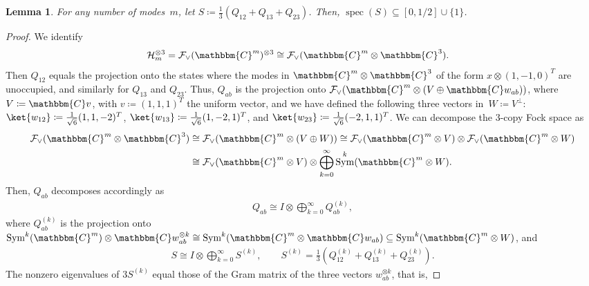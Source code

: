 \documentclass[11pt,a4paper]{article}
\newtheorem{lemma}[theorem]{Lemma}\AddToHook{env/lemma/begin}{\crefalias{theorem}{lemma}}
\numberwithin{equation}{section}
\newcommand{\ot}{\otimes}
\newcommand{\op}{\oplus}
\newcommand{\CC}{\mathbbm{C}}
\newcommand{\HH}{\mathcal{H}}
\newcommand{\1}{\mathbf{1}}
\DeclareMathOperator{\Sym}{Sym}
\DeclareMathOperator{\spec}{spec}
\begin{document}
\begin{lemma}\label{lem:S-spectrum-coherent-states}
For any number of modes~$m$, let $S \coloneqq \frac13 ( Q_{12} + Q_{13} + Q_{23} )$.
Then, $\spec(S)\subseteq[0,1/2]\cup\{1\}$.
\end{lemma}
\begin{proof}
    We identify
    \begin{align*}
        \HH_m^{\ot 3} &=
        \mathcal F_\vee(\CC^m)^{\ot 3} \cong \mathcal F_\vee(\CC^m \ot \CC^3).
    \end{align*}
    Then $Q_{12}$ equals the projection onto the states where the modes in $\CC^m \ot \CC^3$ of the form $x \ot (1,-1,0)^T$ are unoccupied, and similarly for $Q_{13}$ and $Q_{23}$.
    Thus, $Q_{ab}$ is the projection onto $\mathcal F_\vee(\CC^m \ot (V \op \CC w_{ab}))$, where~$V \coloneqq \CC v$, with $v \coloneqq (1,1,1)^T$ the uniform vector, and we have defined the following three vectors in~$W \coloneq V^\perp$:
    $\ket{w_{12}} \coloneqq \frac{1}{\sqrt6}(1,1,-2)^T$,
    $\ket{w_{13}} \coloneqq \frac{1}{\sqrt6}(1,-2,1)^T$, and
    $\ket{w_{23}} \coloneqq \frac{1}{\sqrt6}(-2,1,1)^T$.
    We can decompose the 3-copy Fock space as
    \begin{align*}
        \mathcal F_\vee(\CC^m \ot \CC^3)
        &\cong \mathcal F_\vee(\CC^m \ot (V \op W))
        \cong \mathcal F_\vee(\CC^m \ot V) \ot \mathcal F_\vee(\CC^m \ot W) \\
        &\cong \mathcal F_\vee(\CC^m \ot V) \ot \bigoplus_{k=0}^\infty \Sym^k(\CC^m \ot W).
    \end{align*}
    Then, $Q_{ab}$ decomposes accordingly as
    \begin{align*}
        Q_{ab} \cong I \ot \bigoplus_{k=0}^\infty Q_{ab}^{(k)},
    \end{align*}
    where $Q_{ab}^{(k)}$ is the projection onto $\Sym^k(\CC^m) \ot \CC w_{ab}^{\ot k} \cong \Sym^k(\CC^m \ot \CC w_{ab}) \subseteq \Sym^k(\CC^m \ot W)$, and
    \begin{align*}
        S \cong I \ot \bigoplus_{k=0}^\infty S^{(k)}, \qquad S^{(k)} = \frac13\left(Q_{12}^{(k)} + Q_{13}^{(k)} + Q_{23}^{(k)}\right).
    \end{align*}
    The nonzero eigenvalues of $3S^{(k)}$ equal those of the Gram matrix of the three vectors $w_{ab}^{\ot k}$, that is,

\end{proof}
\end{document}
